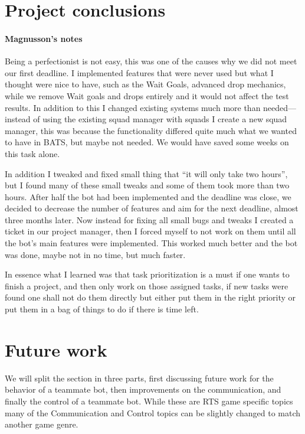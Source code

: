 \section{Project conclusions}
\paragraph{Magnusson's notes}
Being a perfectionist is not easy, this was one of the causes why we did not meet our first
deadline. I implemented features that were never used but what I thought were nice to have, such as
the Wait Goals, advanced drop mechanics, while we remove Wait goals and drops entirely and it would
not affect the test results.
In addition to this I changed existing systems much more than needed—instead of using the existing squad manager with squads I create a new squad manager, this was because the functionality differed quite much what we wanted to have in BATS, but maybe not needed. We would have saved some weeks on this task alone.

In addition I tweaked and fixed small thing that ``it will only take two hours'', but I found many
of these small tweaks and some of them took more than two hours. After half the bot had been
implemented and the deadline was close, we decided to decrease the number of features and aim for
the next deadline, almost three months later. Now instead for fixing all small bugs and tweaks I
created a ticket in our project manager, then I forced myself to not work on them until all the
bot's main features were implemented. This worked much better and the bot was done, maybe not in no
time, but much faster.

In essence what I learned was that task prioritization is a must if one wants to finish a project,
and then only work on those assigned tasks, if new tasks were found one shall not do them directly
but either put them in the right priority or put them in a bag of things to do if there is time
left.

\section{Future work}
We will split the section in three parts, first discussing future work for the behavior of a teammate bot, then improvements on the communication, and finally the control of a teammate bot. While these are RTS game specific topics many of the Communication and Control topics can be slightly changed to match another game genre.

